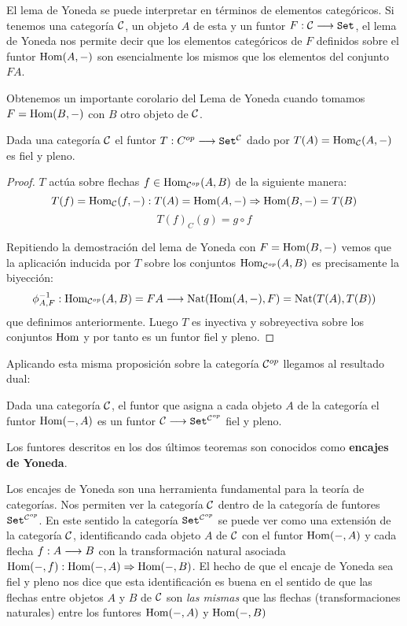 El lema de Yoneda se puede interpretar en términos de elementos
categóricos. Si tenemos una categoría $\mathcal{C}$, un objeto $A$ de esta
y un funtor $F : \mathcal{C}\longrightarrow \texttt{Set}$, el lema de Yoneda nos permite
decir que los elementos categóricos de $F$ definidos sobre
el funtor $\operatorname{Hom}(A, -)$ son esencialmente los mismos que los
elementos del conjunto $F A$.

Obtenemos un importante corolario del Lema de Yoneda cuando tomamos
$F = \operatorname{Hom}(B, -)$ con $B$ otro objeto de $\mathcal{C}$.

\begin{theorem}
  Dada una categoría $\mathcal{C}$
  el funtor $T : C^{op}\longrightarrow \texttt{Set}^{\mathcal{C}}$ dado por
  $T(A) = \operatorname{Hom}_{\mathcal{C}}(A, -)$ es fiel y pleno.
\end{theorem}
\begin{proof}
  $T$ actúa sobre flechas
  $f \in \operatorname{Hom}_{\mathcal{C}^{op}}(A, B)$
  de la siguiente manera:
  $$T(f) = \operatorname{Hom}_{\mathcal{C}}(f, -) : T(A) = \operatorname{Hom}(A, -)\Rightarrow \operatorname{Hom}(B, -) = T(B)$$
  $$T(f)_C(g) = g \circ f$$

  Repitiendo la demostración del lema de Yoneda con
  $F = \operatorname{Hom}(B, -)$ vemos que la aplicación inducida por
  $T$ sobre los conjuntos $\operatorname{Hom}_{\mathcal{C}^{op}}(A, B)$ es precisamente la
  biyección:
  $$\phi_{A, F}^{-1} : 
    \operatorname{Hom}_{\mathcal{C}^{op}}(A, B) = FA
  \longrightarrow 
    \operatorname{Nat}(\operatorname{Hom}(A, -), F) = \operatorname{Nat}(T(A), T(B))
 $$
  que definimos anteriormente.
  Luego $T$ es inyectiva y sobreyectiva sobre los conjuntos
  $\operatorname{Hom}$ y
  por tanto es un funtor fiel y pleno.
\end{proof}

Aplicando esta misma proposición sobre la categoría $\mathcal{C}^{op}$ llegamos
al resultado dual:

\begin{theorem}
  Dada una categoría $\mathcal{C}$, el funtor que asigna a cada objeto
  $A$ de la categoría el funtor $\operatorname{Hom}(-, A)$ es un funtor
  $\mathcal{C}\longrightarrow \texttt{Set}^{\mathcal{C}^{op}}$ fiel y pleno.
\end{theorem}

Los funtores descritos en los dos últimos teoremas son conocidos
como \textbf{encajes de Yoneda}.

Los encajes de Yoneda son una herramienta fundamental para la teoría
de categorías. Nos permiten ver la categoría $\mathcal{C}$ dentro de la
categoría de funtores $\texttt{Set}^{\mathcal{C}^{op}}$. En este sentido
la categoría $\texttt{Set}^{\mathcal{C}^{op}}$ se puede ver como una extensión
de la categoría $\mathcal{C}$, identificando cada objeto $A$ de $\mathcal{C}$
con el funtor $\operatorname{Hom}(-, A)$ y cada flecha $f : A\longrightarrow B$ con la
transformación natural asociada
$\operatorname{Hom}(-, f) : \operatorname{Hom}(-, A)\Rightarrow \operatorname{Hom}(-, B)$. El hecho
de que el encaje de
Yoneda sea fiel y pleno nos dice que esta identificación es buena
en el sentido de que las flechas entre objetos $A$ y $B$ de $\mathcal{C}$
son \textit{las mismas} que las flechas (transformaciones naturales)
entre los funtores
$\operatorname{Hom}(-, A)$ y $\operatorname{Hom}(-, B)$


